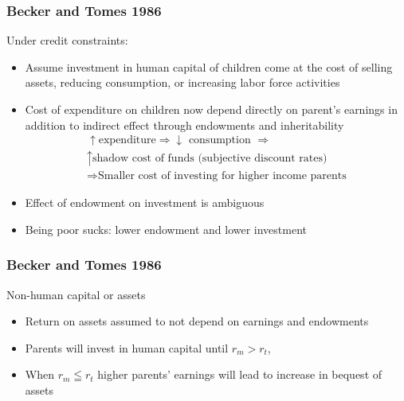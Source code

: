 \documentclass{beamer}
\begin{document}
\begin{frame}
\frametitle{Becker and Tomes 1986}

Under credit constraints:  \\
\begin{itemize}
\item Assume investment in human capital of children come at the cost of selling assets, reducing consumption, or increasing labor force activities

\item Cost of expenditure on children now depend directly on parent's earnings in addition to indirect effect through endowments and inheritability 
\begin{align*}
\uparrow \text{expenditure}  \Rightarrow \downarrow \text{ consumption } \Rightarrow  \\
 \uparrow \text{shadow cost of funds (subjective discount rates)} \\
\Rightarrow \text{Smaller cost of investing for higher income parents} 
\end{align*}

\item Effect of endowment on investment is ambiguous
\item Being poor sucks: lower endowment and lower investment
\end{itemize}
\end{frame}


\begin{frame}
\frametitle{Becker and Tomes 1986}

Non-human capital or assets \\
\begin{itemize}

\item Return on assets assumed to not depend on earnings and endowments
\item Parents will invest in human capital until $r_{m} > r_{t}$, 
\item When $r_{m} \leqq r_{t}$ higher parents' earnings will lead to increase in bequest of assets
\end{itemize}
\end{frame}



\end{document}
